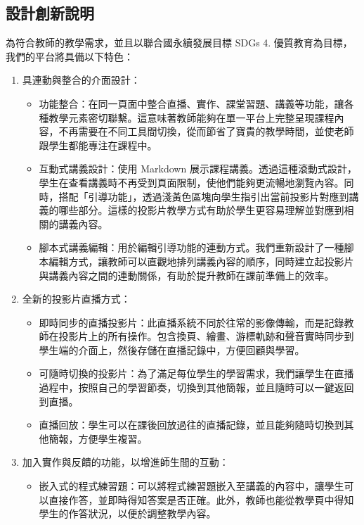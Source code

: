 \documentclass[12pt]{article}
\begin{document}
\subsection{設計創新說明}
\par 為符合教師的教學需求，並且以聯合國永續發展目標 SDGs 4. 優質教育為目標，我們的平台將具備以下特色：
\begin{enumerate}[label=(\arabic*)]
  \item 具連動與整合的介面設計：
  \begin{itemize}
    \item 功能整合：在同一頁面中整合直播、實作、課堂習題、講義等功能，讓各種教學元素密切聯繫。這意味著教師能夠在單一平台上完整呈現課程內容，不再需要在不同工具間切換，從而節省了寶貴的教學時間，並使老師跟學生都能專注在課程中。
    \item 互動式講義設計：使用 Markdown 展示課程講義。透過這種滾動式設計，學生在查看講義時不再受到頁面限制，使他們能夠更流暢地瀏覽內容。同時，搭配「引導功能」，透過淺黃色區塊向學生指引出當前投影片對應到講義的哪些部分。這樣的投影片教學方式有助於學生更容易理解並對應到相關的講義內容。\
    \item 腳本式講義編輯：用於編輯引導功能的連動方式。我們重新設計了一種腳本編輯方式，讓教師可以直觀地排列講義內容的順序，同時建立起投影片與講義內容之間的連動關係，有助於提升教師在課前準備上的效率。
  \end{itemize}
  \item 全新的投影片直播方式：
  \begin{itemize}
    \item 即時同步的直播投影片：此直播系統不同於往常的影像傳輸，而是記錄教師在投影片上的所有操作。包含換頁、繪畫、游標軌跡和聲音實時同步到學生端的介面上，然後存儲在直播記錄中，方便回顧與學習。
    \item 可隨時切換的投影片：為了滿足每位學生的學習需求，我們讓學生在直播過程中，按照自己的學習節奏，切換到其他簡報，並且隨時可以一鍵返回到直播。
    \item 直播回放：學生可以在課後回放過往的直播記錄，並且能夠隨時切換到其他簡報，方便學生複習。
  \end{itemize}
  \item 加入實作與反饋的功能，以增進師生間的互動：
  \begin{itemize}
    \item 嵌入式的程式練習題：可以將程式練習題嵌入至講義的內容中，讓學生可以直接作答，並即時得知答案是否正確。此外，教師也能從教學頁中得知學生的作答狀況，以便於調整教學內容。
      

\end{itemize}
\end{enumerate}
\end{document}
